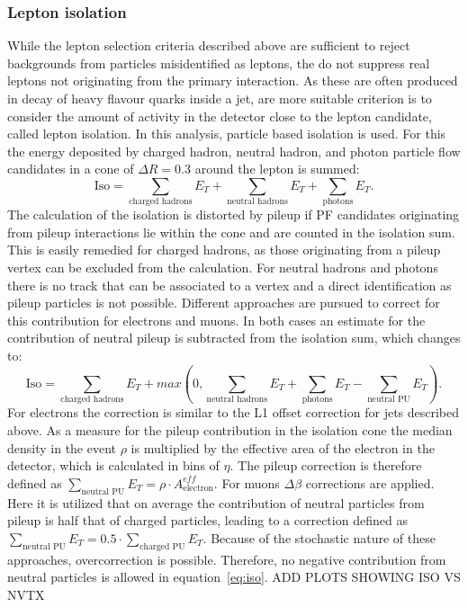 \subsubsection{Lepton isolation}
While the lepton selection criteria described above are sufficient to reject backgrounds from particles misidentified as leptons, the do not suppress real leptons not originating from the primary interaction. As these are often produced in decay of heavy flavour quarks inside a jet, are more suitable criterion is to consider the amount of activity in the detector close to the lepton candidate, called lepton isolation. In this analysis, particle based isolation is used. For this the energy deposited by charged hadron, neutral hadron, and photon particle flow candidates in a cone of $\Delta R = 0.3$ around the lepton is summed:
\begin{equation}
\text{Iso} = \sum\limits_{\text{charged hadrons}} E_T + \sum\limits_{\text{neutral hadrons}} E_T + \sum\limits_{\text{photons}} E_T.
\end{equation}
The calculation of the isolation is distorted by pileup if PF candidates originating from pileup interactions lie within the cone and are counted in the isolation sum. This is easily remedied for charged hadrons, as those originating from a pileup vertex can be excluded from the calculation. For neutral hadrons and photons there is no track that can be associated to a vertex and a direct identification as pileup particles is not possible. Different approaches are pursued to correct for this contribution for electrons and muons. In both cases an estimate for the contribution of neutral pileup is subtracted from the isolation sum, which changes to:
\begin{equation}
\text{Iso} = \sum\limits_{\text{charged hadrons}} E_T + max(0, \sum\limits_{\text{neutral hadrons}} E_T + \sum\limits_{\text{photons}} E_T - \sum\limits_{\text{neutral PU}} E_T). 
\label{eq:iso}
\end{equation}
For electrons the correction is similar to the L1 offset correction for jets described above. As a measure for the pileup contribution in the isolation cone the median \pt density in the event $\rho$ is multiplied by the effective area of the electron in the detector, which is calculated in bins of $\eta$. The pileup correction is therefore defined as $\sum\limits_{\text{neutral PU}} E_T = \rho\cdot A^{eff}_{\text{electron}}$. For muons $\Delta \beta$ corrections are applied. Here it is utilized that on average the contribution of neutral particles from pileup is half that of charged particles, leading to a correction defined as $\sum\limits_{\text{neutral PU}} E_T = 0.5\cdot \sum\limits_{\text{charged PU}} E_T$. Because of the stochastic nature of these approaches, overcorrection is possible. Therefore, no negative contribution from neutral particles is allowed in equation~\ref{eq:iso}. ADD PLOTS SHOWING ISO VS NVTX

